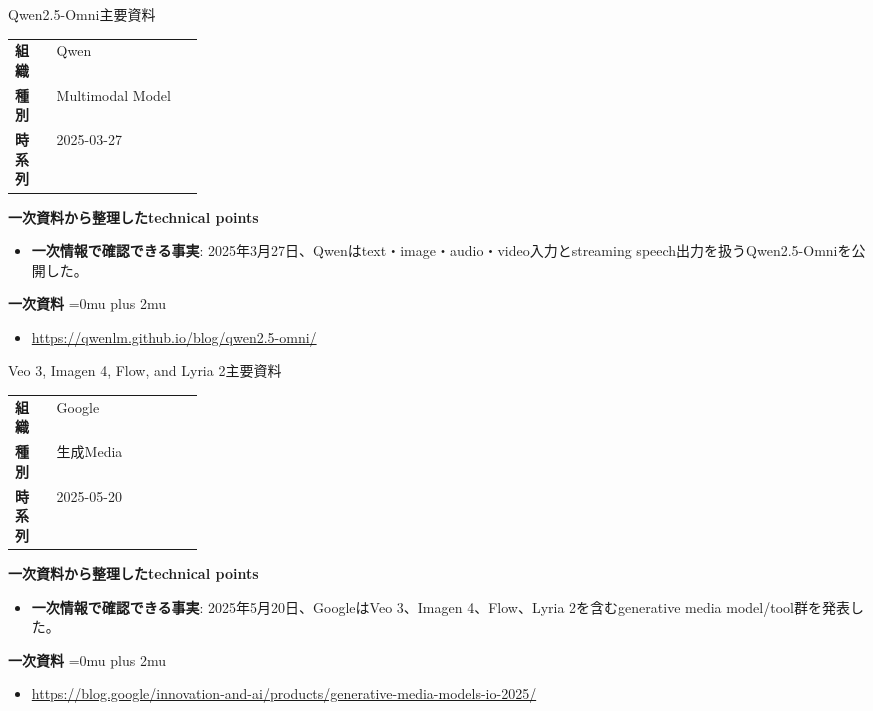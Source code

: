 \begin{technicalnote}{Qwen2.5-Omni}{主要資料}
\begingroup
\begin{tabularx}{\linewidth}{@{}>{\bfseries}p{0.22\linewidth}X@{}}
組織 & Qwen \\
種別 & Multimodal Model \\
時系列 & 2025-03-27 \\
\end{tabularx}
\smallskip
{\bfseries 一次資料から整理したtechnical points}
\begin{itemize}[leftmargin=1.5em,itemsep=0.35em]
\item \textbf{一次情報で確認できる事実}: 2025年3月27日、Qwenはtext・image・audio・video入力とstreaming speech出力を扱うQwen2.5-Omniを公開した。
\end{itemize}
\begin{samepage}
{\bfseries 一次資料}
\begingroup\sloppy
\Urlmuskip=0mu plus 2mu\relax
\begin{itemize}[leftmargin=1.5em,itemsep=0.25em]
\item {\scriptsize\url{https://qwenlm.github.io/blog/qwen2.5-omni/}}
\end{itemize}
\endgroup
\end{samepage}
\endgroup
\end{technicalnote}
\medskip

\begin{technicalnote}{Veo 3, Imagen 4, Flow, and Lyria 2}{主要資料}
\begingroup
\begin{tabularx}{\linewidth}{@{}>{\bfseries}p{0.22\linewidth}X@{}}
組織 & Google \\
種別 & 生成Media \\
時系列 & 2025-05-20 \\
\end{tabularx}
\smallskip
{\bfseries 一次資料から整理したtechnical points}
\begin{itemize}[leftmargin=1.5em,itemsep=0.35em]
\item \textbf{一次情報で確認できる事実}: 2025年5月20日、GoogleはVeo 3、Imagen 4、Flow、Lyria 2を含むgenerative media model/tool群を発表した。
\end{itemize}
\begin{samepage}
{\bfseries 一次資料}
\begingroup\sloppy
\Urlmuskip=0mu plus 2mu\relax
\begin{itemize}[leftmargin=1.5em,itemsep=0.25em]
\item {\scriptsize\url{https://blog.google/innovation-and-ai/products/generative-media-models-io-2025/}}
\end{itemize}
\endgroup
\end{samepage}
\endgroup
\end{technicalnote}
\medskip
